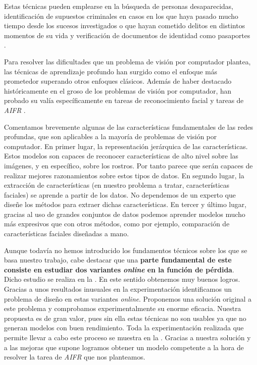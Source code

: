 Estas técnicas pueden emplearse en la búsqueda de personas desaparecidas, identificación de supuestos criminales en casos en los que haya pasado mucho tiempo desde los sucesos investigados o que hayan cometido delitos en distintos momentos de su vida y verificación de documentos de identidad como pasaportes \cite{informatica:aifr_survey}.

Para resolver las dificultades que un problema de visión por computador plantea, las técnicas de aprendizaje profundo han surgido como el enfoque más prometedor superando otros enfoques clásicos. Además de haber destacado históricamente en el groso de los problemas de visión por computador, han probado su valía específicamente en tareas de reconocimiento facial \cite{informatica:deep_fr_survey} y tareas de \textit{AIFR} \cite{informatica:aifr_survey}.

Comentamos brevemente algunas de las características fundamentales de las redes profundas, que son aplicables a la mayoría de problemas de visión por computador. En primer lugar, la representación jerárquica de las características. Estos modelos son capaces de reconocer características de alto nivel sobre las imágenes, y en específico, sobre los rostros. Por tanto parece que serán capaces de realizar mejores razonamientos sobre estos tipos de datos. En segundo lugar, la extracción de características (en nuestro problema a tratar, características faciales) se aprende a partir de los datos. No dependemos de un experto que diseñe los métodos para extraer dichas características. En tercer y último lugar, gracias al uso de grandes conjuntos de datos podemos aprender modelos mucho más expresivos que con otros métodos, como por ejemplo, comparación de características faciales diseñadas a mano.

Aunque todavía no hemos introducido los fundamentos técnicos sobre los que se basa nuestro trabajo, cabe destacar que una \textbf{parte fundamental de este consiste en estudiar dos variantes \textit{online} en la función de pérdida}. Dicho estudio se realiza en la . En este sentido obtenemos muy buenos logros. Gracias a unos resultados inusuales en la experimentación identificamos un problema de diseño en estas variantes \textit{online}. Proponemos una solución original a este problema y comprobamos experimentalmente su enorme eficacia. Nuestra propuesta es de gran valor, pues sin ella estas técnicas no son usables ya que no generan modelos con buen rendimiento. Toda la experimentación realizada que permite llevar a cabo este proceso se muestra en la . Gracias a nuestra solución y a las mejoras que supone logramos obtener un modelo competente a la hora de resolver la tarea de \textit{AIFR} que nos planteamos.

